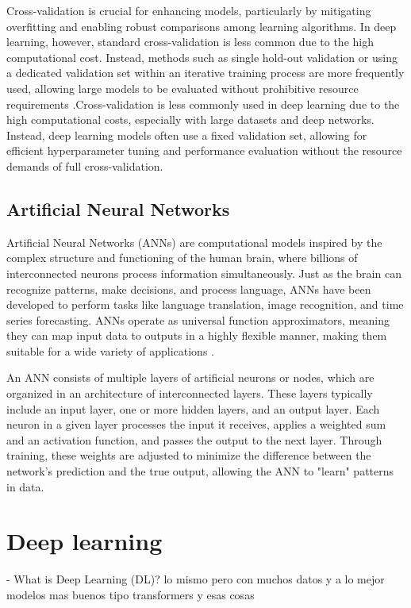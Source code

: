 \documentclass{article}
\begin{document}
Cross-validation is crucial for enhancing models, particularly by mitigating overfitting and enabling robust comparisons among learning algorithms. In deep learning, however, standard cross-validation is less common due to the high computational cost. Instead, methods such as single hold-out validation or using a dedicated validation set within an iterative training process are more frequently used, allowing large models to be evaluated without prohibitive resource requirements \cite{berrar2019cross}.Cross-validation is less commonly used in deep learning due to the high computational costs, especially with large datasets and deep networks. Instead, deep learning models often use a fixed validation set, allowing for efficient hyperparameter tuning and performance evaluation without the resource demands of full cross-validation.


\subsection{Artificial Neural Networks}

Artificial Neural Networks (ANNs) are computational models inspired by the complex structure and functioning of the human brain, where billions of interconnected neurons process information simultaneously. Just as the brain can recognize patterns, make decisions, and process language, ANNs have been developed to perform tasks like language translation, image recognition, and time series forecasting. ANNs operate as universal function approximators, meaning they can map input data to outputs in a highly flexible manner, making them suitable for a wide variety of applications \cite{wang2003artificial}.

An ANN consists of multiple layers of artificial neurons or nodes, which are organized in an architecture of interconnected layers. These layers typically include an input layer, one or more hidden layers, and an output layer. Each neuron in a given layer processes the input it receives, applies a weighted sum and an activation function, and passes the output to the next layer. Through training, these weights are adjusted to minimize the difference between the network’s prediction and the true output, allowing the ANN to "learn" patterns in data.





\section{Deep learning}
- What is Deep Learning (DL)? lo mismo pero con muchos datos y a lo mejor modelos mas buenos tipo transformers  y esas cosas\\
\end{document}
